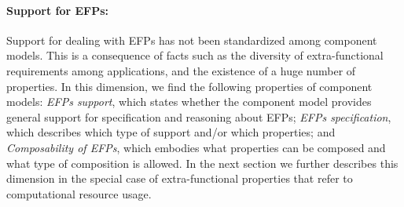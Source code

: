 
%

\paragraph{Support for EFPs:}

Support for dealing with EFPs has not been standardized among component models.
This is a consequence of facts such as the diversity of extra-functional requirements among applications, and the existence of a huge number of properties.
In this dimension, we find the following properties of component models: \textit{EFPs support}, which states whether the component model provides general support for specification and reasoning about EFPs; 
\textit{EFPs specification}, which describes which type of support and/or which properties;
and \textit{Composability of EFPs}, which embodies what properties can be composed and what type of composition is allowed.
In the next section we further describes this dimension in the special case of extra-functional properties that refer to computational resource usage.



